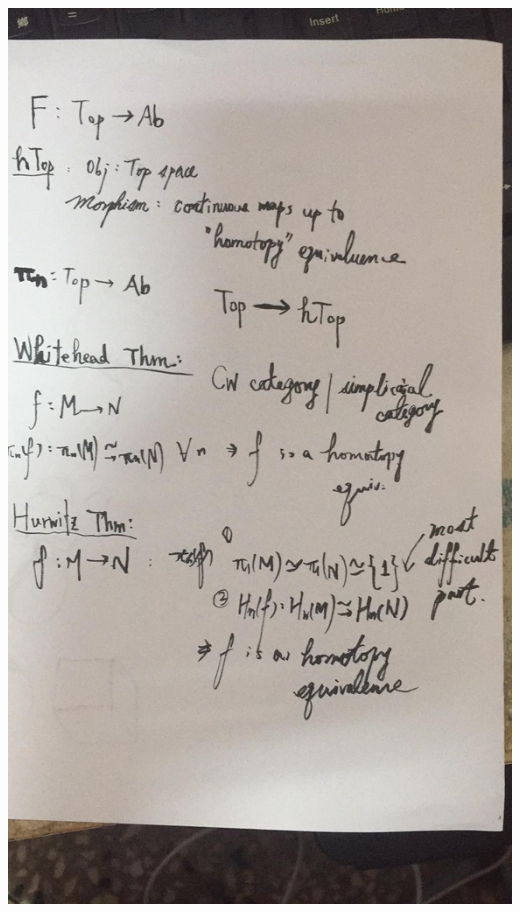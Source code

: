 \documentclass{book}
\numberwithin{equation}{section}
\begin{document}
\newpage
\includegraphics[scale=0.2]{homotopy.jpg}
\end{document}
